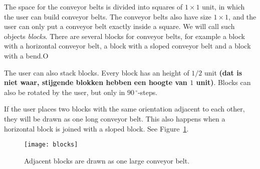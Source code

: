 The space for the conveyor belts is divided into squares of $1 \times 1$ unit, in which the user can build conveyor belts. The conveyor belts also have size $1 \times 1$, and the user can only put a conveyor belt exactly inside a square. We will call such objects \textit{blocks}. There are several blocks for conveyor belts, for example a block with a horizontal conveyor belt, a block with a sloped conveyor belt and a block with a bend.O

The user can also stack blocks. Every block has an height of $1/2$ unit \textbf{(dat is niet waar, stijgende blokken hebben een hoogte van $1$ unit)}. Blocks can also be rotated by the user, but only in $90\,^\circ$-steps.

If the user places two blocks with the same orientation adjacent to each other, they will be drawn as one long conveyor belt. This also happens when a horizontal block is joined with a sloped block. See Figure~\ref{fig:blocks}.

\begin{figure}
  \begin{center}
    \texttt{[image: blocks]}
    \caption{Adjacent blocks are drawn as one large conveyor belt.}
    \label{fig:blocks}
  \end{center}
\end{figure}
